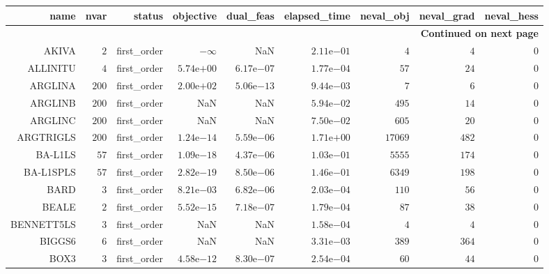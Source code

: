 \begin{longtable}{rrrrrrrrr}
\hline
name & nvar & status & objective & dual\_feas & elapsed\_time & neval\_obj & neval\_grad & neval\_hess \\\hline
\endhead
\hline
\multicolumn{9}{r}{{\bfseries Continued on next page}}\\
\hline
\endfoot
\endlastfoot
AKIVA & \(     2\) & first\_order & \(-\infty\) &       NaN & \( 2.11\)e\(-01\) & \(     4\) & \(     4\) & \(     0\) \\
ALLINITU & \(     4\) & first\_order & \( 5.74\)e\(+00\) & \( 6.17\)e\(-07\) & \( 1.77\)e\(-04\) & \(    57\) & \(    24\) & \(     0\) \\
ARGLINA & \(   200\) & first\_order & \( 2.00\)e\(+02\) & \( 5.06\)e\(-13\) & \( 9.44\)e\(-03\) & \(     7\) & \(     6\) & \(     0\) \\
ARGLINB & \(   200\) & first\_order &       NaN &       NaN & \( 5.94\)e\(-02\) & \(   495\) & \(    14\) & \(     0\) \\
ARGLINC & \(   200\) & first\_order &       NaN &       NaN & \( 7.50\)e\(-02\) & \(   605\) & \(    20\) & \(     0\) \\
ARGTRIGLS & \(   200\) & first\_order & \( 1.24\)e\(-14\) & \( 5.59\)e\(-06\) & \( 1.71\)e\(+00\) & \( 17069\) & \(   482\) & \(     0\) \\
BA-L1LS & \(    57\) & first\_order & \( 1.09\)e\(-18\) & \( 4.37\)e\(-06\) & \( 1.03\)e\(-01\) & \(  5555\) & \(   174\) & \(     0\) \\
BA-L1SPLS & \(    57\) & first\_order & \( 2.82\)e\(-19\) & \( 8.50\)e\(-06\) & \( 1.46\)e\(-01\) & \(  6349\) & \(   198\) & \(     0\) \\
BARD & \(     3\) & first\_order & \( 8.21\)e\(-03\) & \( 6.82\)e\(-06\) & \( 2.03\)e\(-04\) & \(   110\) & \(    56\) & \(     0\) \\
BEALE & \(     2\) & first\_order & \( 5.52\)e\(-15\) & \( 7.18\)e\(-07\) & \( 1.79\)e\(-04\) & \(    87\) & \(    38\) & \(     0\) \\
BENNETT5LS & \(     3\) & first\_order &       NaN &       NaN & \( 1.58\)e\(-04\) & \(     4\) & \(     4\) & \(     0\) \\
BIGGS6 & \(     6\) & first\_order &       NaN &       NaN & \( 3.31\)e\(-03\) & \(   389\) & \(   364\) & \(     0\) \\
BOX3 & \(     3\) & first\_order & \( 4.58\)e\(-12\) & \( 8.30\)e\(-07\) & \( 2.54\)e\(-04\) & \(    60\) & \(    44\) & \(     0\) \\

\end{longtable}
